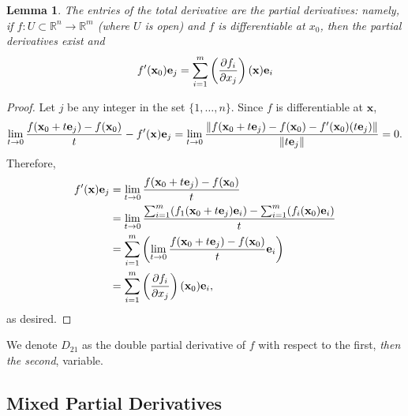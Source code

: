 \documentclass[11pt]{article}
\renewcommand{\vec}[1]{\mathbf{#1}}
\newtheorem*{lemma*}{Lemma}
\begin{document}
\begin{adjustwidth}{0.5cm}{}
	\begin{lemma*}
		The entries of the total derivative are the partial derivatives: namely, if $f: U \subset \mathbb{R}^{n} \to \mathbb{R}^{m}$ (where $U$ is open) and $f$ is differentiable at $x_{0}$, then the partial derivatives exist and 
		\[
			f'(\vec{x}_{0}) \vec{e}_{j} = \sum_{i = 1}^{m}\left(\pdv{f_{i}}{x_{j}}\right) (\vec{x})\vec{e}_{i} 
		\]
	\end{lemma*}
    \begin{proof}\renewcommand{\qedsymbol}{}
		Let $j$ be any integer in the set $\{ 1, \ldots, n \}$. Since $f$ is differentiable at $\vec{x}$,
		\[
			\lim\limits_{t \to 0} \frac{f(\vec{x}_{0} + t \vec{e}_{j}) - f(\vec{x}_{0})}{t} - f'(\vec{x}) \vec{e}_{j} = \lim\limits_{t \to 0} \frac{\norm{f(\vec{x}_{0} + t \vec{e}_{j}) - f(\vec{x}_{0}) - f'(\vec{x}_{0})(t \vec{e}_{j})}}{\norm{t \vec{e}_{j}}} = 0.
		\]
		Therefore,
		\begin{align*}
			f'(\vec{x}) \vec{e}_{j} &= \lim\limits_{t \to 0} \frac{f(\vec{x}_{0} + t \vec{e}_{j}) -   f(\vec{x}_{0})}{t} \\
			&= \lim\limits_{t \to 0} \frac{\sum_{i = 1}^{m} (f_{1}(\vec{x}_{0} + t \vec{e}_{j})\vec{e}_{i}) - \sum_{i = 1}^{m} (f_{i}(\vec{x}_{0})\vec{e}_{i})}{t} \\
			&= \sum_{i = 1}^{m} \left(\lim\limits_{t \to 0} \frac{f(\vec{x}_{0} + t \vec{\vec{e}}_{j}) - f(\vec{x}_{0})}{t} \vec{e}_{i}\right) \\
			&= \sum_{i = 1}^{m} \left(\pdv{f_{i}}{x_{j}}\right) (\vec{x}_{0}) \vec{e}_{i},
		\end{align*}
		as desired.
	\end{proof}
\end{adjustwidth}


We denote $D_{21}$ as the double partial derivative of $f$ with respect to the first, \textit{then the second}, variable.

\subsection{Mixed Partial Derivatives}
\end{document}

